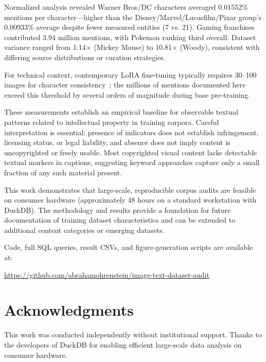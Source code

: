 \documentclass[11pt]{article}
\begin{document}
Normalized analysis revealed Warner Bros/DC characters averaged 0.01552\% mentions per character—higher than the Disney/Marvel/Lucasfilm/Pixar group's 0.00933\% average despite fewer measured entities (7 vs. 21). Gaming franchises contributed 3.94 million mentions, with Pokemon ranking third overall. Dataset variance ranged from 1.14$\times$ (Mickey Mouse) to 10.81$\times$ (Woody), consistent with differing source distributions or curation strategies.

For technical context, contemporary LoRA fine-tuning typically requires 30--100 images for character consistency~\citep{hu2021lora}; the millions of mentions documented here exceed this threshold by several orders of magnitude during base pre-training.

These measurements establish an empirical baseline for observable textual patterns related to intellectual property in training corpora. Careful interpretation is essential: presence of indicators does not establish infringement, licensing status, or legal liability, and absence does not imply content is uncopyrighted or freely usable. Most copyrighted visual content lacks detectable textual markers in captions, suggesting keyword approaches capture only a small fraction of any such material present.

This work demonstrates that large-scale, reproducible corpus audits are feasible on consumer hardware (approximately 48 hours on a standard workstation with DuckDB). The methodology and results provide a foundation for future documentation of training dataset characteristics and can be extended to additional content categories or emerging datasets.

Code, full SQL queries, result CSVs, and figure-generation scripts are available at:  
\begin{center}
\url{https://github.com/abrahamohrenstein/image-text-dataset-audit} 
\end{center}

\section*{Acknowledgments}
This work was conducted independently without institutional support. Thanks to the developers of DuckDB for enabling efficient large-scale data analysis on consumer hardware.




\clearpage
\end{document}
